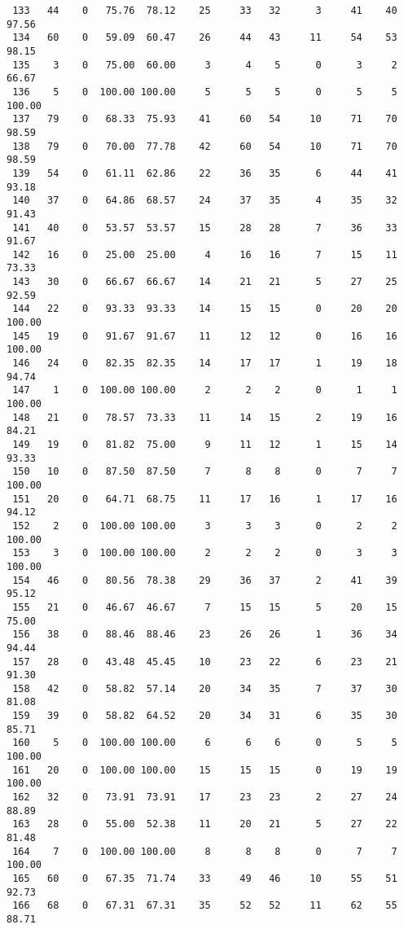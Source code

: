\begin{verbatim}
 133   44    0   75.76  78.12    25     33   32      3     41    40    97.56
 134   60    0   59.09  60.47    26     44   43     11     54    53    98.15
 135    3    0   75.00  60.00     3      4    5      0      3     2    66.67
 136    5    0  100.00 100.00     5      5    5      0      5     5   100.00
 137   79    0   68.33  75.93    41     60   54     10     71    70    98.59
 138   79    0   70.00  77.78    42     60   54     10     71    70    98.59
 139   54    0   61.11  62.86    22     36   35      6     44    41    93.18
 140   37    0   64.86  68.57    24     37   35      4     35    32    91.43
 141   40    0   53.57  53.57    15     28   28      7     36    33    91.67
 142   16    0   25.00  25.00     4     16   16      7     15    11    73.33
 143   30    0   66.67  66.67    14     21   21      5     27    25    92.59
 144   22    0   93.33  93.33    14     15   15      0     20    20   100.00
 145   19    0   91.67  91.67    11     12   12      0     16    16   100.00
 146   24    0   82.35  82.35    14     17   17      1     19    18    94.74
 147    1    0  100.00 100.00     2      2    2      0      1     1   100.00
 148   21    0   78.57  73.33    11     14   15      2     19    16    84.21
 149   19    0   81.82  75.00     9     11   12      1     15    14    93.33
 150   10    0   87.50  87.50     7      8    8      0      7     7   100.00
 151   20    0   64.71  68.75    11     17   16      1     17    16    94.12
 152    2    0  100.00 100.00     3      3    3      0      2     2   100.00
 153    3    0  100.00 100.00     2      2    2      0      3     3   100.00
 154   46    0   80.56  78.38    29     36   37      2     41    39    95.12
 155   21    0   46.67  46.67     7     15   15      5     20    15    75.00
 156   38    0   88.46  88.46    23     26   26      1     36    34    94.44
 157   28    0   43.48  45.45    10     23   22      6     23    21    91.30
 158   42    0   58.82  57.14    20     34   35      7     37    30    81.08
 159   39    0   58.82  64.52    20     34   31      6     35    30    85.71
 160    5    0  100.00 100.00     6      6    6      0      5     5   100.00
 161   20    0  100.00 100.00    15     15   15      0     19    19   100.00
 162   32    0   73.91  73.91    17     23   23      2     27    24    88.89
 163   28    0   55.00  52.38    11     20   21      5     27    22    81.48
 164    7    0  100.00 100.00     8      8    8      0      7     7   100.00
 165   60    0   67.35  71.74    33     49   46     10     55    51    92.73
 166   68    0   67.31  67.31    35     52   52     11     62    55    88.71

\end{verbatim}
